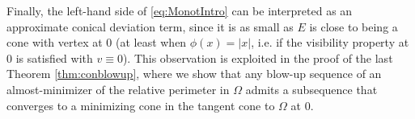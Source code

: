 \documentclass[a4paper,reqno,11pt]{amsart}
\newcommand{\de}{\partial}
\begin{document}
Finally, the left-hand side of \eqref{eq:MonotIntro} can be interpreted as an approximate conical deviation term, since it is as small as $E$ is close to being a cone with vertex at $0$ (at least when $\phi(x) = |x|$, i.e. if the visibility property at $0$ is satisfied with $v \equiv 0$). This observation is exploited in the proof of the last Theorem \ref{thm:conblowup}, where we show that any blow-up sequence of an almost-minimizer of the relative perimeter in $\Omega$ admits a subsequence that converges to a minimizing cone in the tangent cone to $\Omega$ at $0$.
%
%
%
%



	
\end{document}
